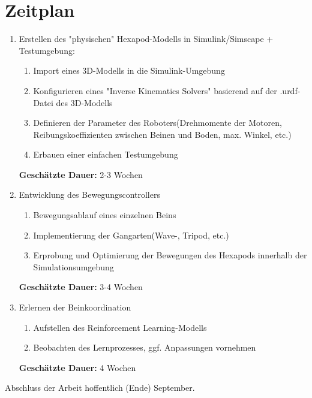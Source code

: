 \section{Zeitplan}
\begin{enumerate}
	\item Erstellen des "physischen" Hexapod-Modells in Simulink/Simscape + Testumgebung:
	\begin{enumerate}[label*=\arabic*.]
		\item Import eines 3D-Modells in die Simulink-Umgebung
		\item Konfigurieren eines "Inverse Kinematics Solvers" basierend auf der .urdf-Datei des 3D-Modells
		\item Definieren der Parameter des Roboters(Drehmomente der Motoren, Reibungskoeffizienten zwischen Beinen und Boden, max. Winkel, etc.)
		\item Erbauen einer einfachen Testumgebung
	\end{enumerate}
	\textbf{Geschätzte Dauer:} 2-3 Wochen
	
	\item Entwicklung des Bewegungscontrollers
	\begin{enumerate}[label*=\arabic*.]
		\item Bewegungsablauf eines einzelnen Beins
		\item Implementierung der Gangarten(Wave-, Tripod, etc.)	
		\item Erprobung und Optimierung der Bewegungen des Hexapods innerhalb der Simulationsumgebung
	\end{enumerate}
	\textbf{Geschätzte Dauer:} 3-4 Wochen
	
	\item Erlernen der Beinkoordination
	\begin{enumerate}[label*=\arabic*.]
		\item Aufstellen des Reinforcement Learning-Modells
		\item Beobachten des Lernprozesses, ggf. Anpassungen vornehmen
	\end{enumerate}
	\textbf{Geschätzte Dauer:} 4 Wochen
	

\end{enumerate}


Abschluss der Arbeit hoffentlich (Ende) September.